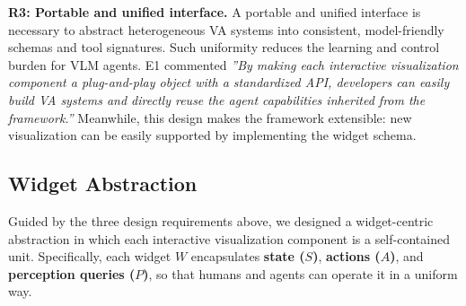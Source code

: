 \textbf{R3: Portable and unified interface.}
A portable and unified interface is necessary to abstract heterogeneous VA systems into consistent, model-friendly schemas and tool signatures.
Such uniformity reduces the learning and control burden for VLM agents.
E1 commented \textit{''By making each interactive visualization component a plug-and-play object with a standardized API, developers can easily build VA systems and directly reuse the agent capabilities inherited from the framework.''}
Meanwhile, this design makes the framework extensible: new visualization can be easily supported by implementing the widget schema.




\subsection{Widget Abstraction}
\label{sec:framework_widget}


Guided by the three design requirements above, we designed a widget-centric abstraction in which each interactive visualization component is a self-contained unit.
Specifically, each widget $W$ encapsulates \textbf{state ($S$)}, \textbf{actions ($A$)}, and \textbf{perception queries ($P$)}, so that humans and agents can operate it in a uniform way.

